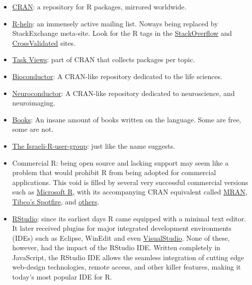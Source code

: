 \documentclass[]{book}
\theoremstyle{definition}
\theoremstyle{definition}
\theoremstyle{definition}
\theoremstyle{remark}
\begin{document}
\begin{itemize}
\item
  \href{https://cran.r-project.org/}{CRAN}: a repository for R packages,
  mirrored worldwide.
\item
  \href{https://www.r-project.org/mail.html}{R-help}: an immensely
  active mailing list. Noways being replaced by StackExchange meta-site.
  Look for the R tags in the
  \href{http://stackoverflow.com/}{StackOverflow} and
  \href{http://stats.stackexchange.com/}{CrossValidated} sites.
\item
  \href{https://cran.r-project.org/web/views/}{Task Views}: part of CRAN
  that collects packages per topic.
\item
  \href{https://www.bioconductor.org/}{Bioconductor}: A CRAN-like
  repository dedicated to the life sciences.
\item
  \href{https://www.neuroconductor.org/}{Neuroconductor}: A CRAN-like
  repository dedicated to neuroscience, and neuroimaging.
\item
  \href{https://www.r-project.org/doc/bib/R-books.html}{Books}: An
  insane amount of books written on the language. Some are free, some
  are not.
\item
  \href{https://groups.google.com/forum/\#!forum/israel-r-user-group}{The
  Israeli-R-user-group}: just like the name suggests.
\item
  Commercial R: being open source and lacking support may seem like a
  problem that would prohibit R from being adopted for commercial
  applications. This void is filled by several very successful
  commercial versions such as
  \href{https://mran.microsoft.com/open/}{Microsoft R}, with its
  accompanying CRAN equivalent called
  \href{https://mran.microsoft.com/}{MRAN},
  \href{http://spotfire.tibco.com/discover-spotfire/what-does-spotfire-do/predictive-analytics/tibco-enterprise-runtime-for-r-terr}{Tibco's
  Spotfire}, and
  \href{https://en.wikipedia.org/wiki/R_(programming_language)\#Commercial_support_for_R}{others}.
\item
  \href{https://www.rstudio.com/products/rstudio/download-server/}{RStudio}:
  since its earliest days R came equipped with a minimal text editor. It
  later received plugins for major integrated development environments
  (IDEs) such as Eclipse, WinEdit and even
  \href{https://www.visualstudio.com/vs/rtvs/}{VisualStudio}. None of
  these, however, had the impact of the RStudio IDE. Written completely
  in JavaScript, the RStudio IDE allows the seamless integration of
  cutting edge web-design technologies, remote access, and other killer
  features, making it today's most popular IDE for R.
\end{itemize}
\end{document}
